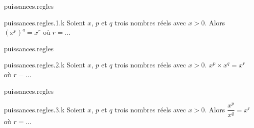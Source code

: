 \begin{qcm}{puissances.regles}
  \begin{question}{puissances.regles.1.k}
    Soient \(x\), \(p\) et \(q\) trois nombres réels avec \(x>0\). Alors \({\left(x^p\right)}^q=x^r\) où \(r=\ldots\)
    \vspace{-1.5ex}
    \begin{multicols}{3}
      \begin{reponses}
        \lastchoices

        \phantom{foo}
      \end{reponses}
    \end{multicols}
  \end{question}
\end{qcm}

\begin{qcm}{puissances.regles}
  \begin{question}{puissances.regles.2.k}
    Soient \(x\), \(p\) et \(q\) trois nombres réels avec \(x>0\). \(x^p \times x^q=x^r\) où \(r=\ldots\)
    \vspace{-1.5ex}
    \begin{multicols}{3}
      \begin{reponses}
        \lastchoices

        \phantom{foo}
      \end{reponses}
    \end{multicols}
  \end{question}
\end{qcm}

\begin{qcm}{puissances.regles}
  \begin{question}{puissances.regles.3.k}
    Soient \(x\), \(p\) et \(q\) trois nombres réels avec \(x>0\). Alors \(\dfrac{x^p}{x^q}=x^r\) où \(r=\ldots\)
    \vspace{-1.5ex}
    \begin{multicols}{3}
      \begin{reponses}
        \lastchoices

        \phantom{foo}
      \end{reponses}
    \end{multicols}
  \end{question}
\end{qcm}

